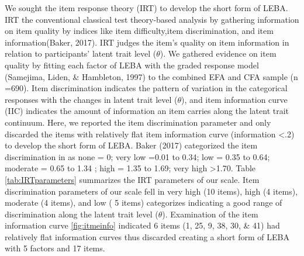 \documentclass[
  english,
  man]{apa6}
\begin{document}
We sought the item response theory (IRT) to develop the short form of LEBA. IRT the conventional classical test theory-based analysis by gathering information on item quality by indices like item difficulty,item discrimination, and item information(Baker, 2017). IRT judges the item's quality on item information in relation to participants' latent trait level (\(\theta\)). We gathered evidence on item quality by fitting each factor of LEBA with the graded response model (Samejima, Liden, \& Hambleton, 1997) to the combined EFA and CFA sample (n =690). Item discrimination indicates the pattern of variation in the categorical responses with the changes in latent trait level (\(\theta\)), and item information curve (IIC) indicates the amount of information an item carries along the latent trait continuum. Here, we reported the item discrimination parameter and only discarded the items with relatively flat item information curve (information \textless.2) to develop the short form of LEBA. Baker (2017) categorized the item discrimination in as none = 0; very low =0.01 to 0.34; low = 0.35 to 0.64; moderate = 0.65 to 1.34 ; high = 1.35 to 1.69; very high \textgreater1.70. Table \ref{tab:IRTparameters} summarizes the IRT parameters of our scale. Item discrimination parameters of our scale fell in very high (10 items), high (4 items), moderate (4 items), and low ( 5 items) categorizes indicating a good range of discrimination along the latent trait level (\(\theta\)). Examination of the item information curve \ref{fig:itmeinfo} indicated 6 items (1, 25, 9, 38, 30, \& 41) had relatively flat information curves thus discarded creating a short form of LEBA with 5 factors and 17 items.
\end{document}
